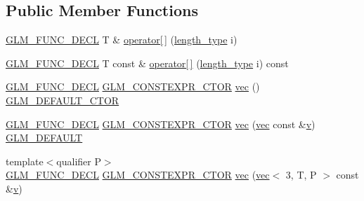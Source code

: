 \subsection*{Public Member Functions}
\begin{DoxyCompactItemize}
\item 
\mbox{\hyperlink{setup_8hpp_ab2d052de21a70539923e9bcbf6e83a51}{G\+L\+M\+\_\+\+F\+U\+N\+C\+\_\+\+D\+E\+CL}} T \& \mbox{\hyperlink{structglm_1_1vec_3_013_00_01_t_00_01_q_01_4_a7f555e7e0581a8e53ac675fde684055b}{operator\mbox{[}$\,$\mbox{]}}} (\mbox{\hyperlink{structglm_1_1vec_3_013_00_01_t_00_01_q_01_4_ab586a87f82719bfdd180336a98843257}{length\+\_\+type}} i)
\item 
\mbox{\hyperlink{setup_8hpp_ab2d052de21a70539923e9bcbf6e83a51}{G\+L\+M\+\_\+\+F\+U\+N\+C\+\_\+\+D\+E\+CL}} T const  \& \mbox{\hyperlink{structglm_1_1vec_3_013_00_01_t_00_01_q_01_4_a361188d270506795b9a46c2fc2857e69}{operator\mbox{[}$\,$\mbox{]}}} (\mbox{\hyperlink{structglm_1_1vec_3_013_00_01_t_00_01_q_01_4_ab586a87f82719bfdd180336a98843257}{length\+\_\+type}} i) const
\item 
\mbox{\hyperlink{setup_8hpp_ab2d052de21a70539923e9bcbf6e83a51}{G\+L\+M\+\_\+\+F\+U\+N\+C\+\_\+\+D\+E\+CL}} \mbox{\hyperlink{setup_8hpp_ad34178a09666081abdb573c14d1f4a5a}{G\+L\+M\+\_\+\+C\+O\+N\+S\+T\+E\+X\+P\+R\+\_\+\+C\+T\+OR}} \mbox{\hyperlink{structglm_1_1vec_3_013_00_01_t_00_01_q_01_4_af6f5237c5ef6d93d6125989b4657b3cc}{vec}} () \mbox{\hyperlink{setup_8hpp_afb97a4e995bc004c0cbbfa22125b80ba}{G\+L\+M\+\_\+\+D\+E\+F\+A\+U\+L\+T\+\_\+\+C\+T\+OR}}
\item 
\mbox{\hyperlink{setup_8hpp_ab2d052de21a70539923e9bcbf6e83a51}{G\+L\+M\+\_\+\+F\+U\+N\+C\+\_\+\+D\+E\+CL}} \mbox{\hyperlink{setup_8hpp_ad34178a09666081abdb573c14d1f4a5a}{G\+L\+M\+\_\+\+C\+O\+N\+S\+T\+E\+X\+P\+R\+\_\+\+C\+T\+OR}} \mbox{\hyperlink{structglm_1_1vec_3_013_00_01_t_00_01_q_01_4_ae7088be55070909fe11da6bead3679f9}{vec}} (\mbox{\hyperlink{structglm_1_1vec}{vec}} const \&\mbox{\hyperlink{_s_d_l__opengl_8h_a10a82eabcb59d2fcd74acee063775f90}{v}}) \mbox{\hyperlink{setup_8hpp_aefce7051c376a64ba89fa93a9f63bc2c}{G\+L\+M\+\_\+\+D\+E\+F\+A\+U\+LT}}
\item 
{\footnotesize template$<$qualifier P$>$ }\\\mbox{\hyperlink{setup_8hpp_ab2d052de21a70539923e9bcbf6e83a51}{G\+L\+M\+\_\+\+F\+U\+N\+C\+\_\+\+D\+E\+CL}} \mbox{\hyperlink{setup_8hpp_ad34178a09666081abdb573c14d1f4a5a}{G\+L\+M\+\_\+\+C\+O\+N\+S\+T\+E\+X\+P\+R\+\_\+\+C\+T\+OR}} \mbox{\hyperlink{structglm_1_1vec_3_013_00_01_t_00_01_q_01_4_a1b43d4595236da757e4054e1a4717153}{vec}} (\mbox{\hyperlink{structglm_1_1vec}{vec}}$<$ 3, T, P $>$ const \&\mbox{\hyperlink{_s_d_l__opengl_8h_a10a82eabcb59d2fcd74acee063775f90}{v}})

\end{DoxyCompactItemize}
